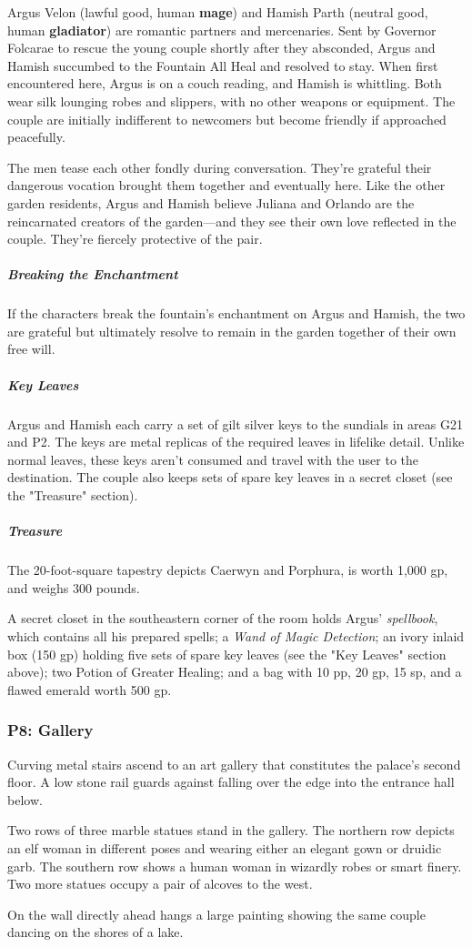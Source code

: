 \documentclass[10pt,a4paper,twoside,bg=print,twocolumn,openany,nodeprecatedcode]{dndbook}
\begin{document}
Argus Velon (lawful good, human \textbf{mage}) and Hamish Parth (neutral good, human \textbf{gladiator}) are romantic partners and mercenaries. Sent by Governor Folcarae to rescue the young couple shortly after they absconded, Argus and Hamish succumbed to the Fountain All Heal and resolved to stay. When first encountered here, Argus is on a couch reading, and Hamish is whittling. Both wear silk lounging robes and slippers, with no other weapons or equipment. The couple are initially indifferent to newcomers but become friendly if approached peacefully.

The men tease each other fondly during conversation. They're grateful their dangerous vocation brought them together and eventually here. Like the other garden residents, Argus and Hamish believe Juliana and Orlando are the reincarnated creators of the garden—and they see their own love reflected in the couple. They're fiercely protective of the pair.

\subparagraph{Breaking the Enchantment}
If the characters break the fountain's enchantment on Argus and Hamish, the two are grateful but ultimately resolve to remain in the garden together of their own free will.

\subparagraph{Key Leaves}
Argus and Hamish each carry a set of gilt silver keys to the sundials in areas G21 and P2. The keys are metal replicas of the required leaves in lifelike detail. Unlike normal leaves, these keys aren't consumed and travel with the user to the destination. The couple also keeps sets of spare key leaves in a secret closet (see the "Treasure" section).

\subparagraph{Treasure}
The 20-foot-square tapestry depicts Caerwyn and Porphura, is worth 1,000 gp, and weighs 300 pounds.

A secret closet in the southeastern corner of the room holds Argus' \textit{spellbook}, which contains all his prepared spells; a \textit{Wand of Magic Detection}; an ivory inlaid box (150 gp) holding five sets of spare key leaves (see the "Key Leaves" section above); two Potion of Greater Healing; and a bag with 10 pp, 20 gp, 15 sp, and a flawed emerald worth 500 gp.

\subsubsection{P8: Gallery}
\begin{DndReadAloud}{}
Curving metal stairs ascend to an art gallery that constitutes the palace's second floor. A low stone rail guards against falling over the edge into the entrance hall below.

Two rows of three marble statues stand in the gallery. The northern row depicts an elf woman in different poses and wearing either an elegant gown or druidic garb. The southern row shows a human woman in wizardly robes or smart finery. Two more statues occupy a pair of alcoves to the west.

On the wall directly ahead hangs a large painting showing the same couple dancing on the shores of a lake.

\end{DndReadAloud}
\end{document}
